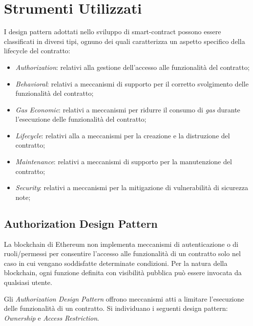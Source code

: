 \chapter{Strumenti Utilizzati}
I design pattern adottati nello sviluppo di smart-contract possono essere classificati in diversi tipi\cite[alcuni tipi]{9089272}\cite{9050163}, ognuno dei quali caratterizza un aspetto specifico della lifecycle del contratto:

\begin{itemize}
	\item \textit{Authorization}: relativi alla gestione dell'accesso alle funzionalità del contratto;
	\item \textit{Behavioral}: relativi a meccanismi di supporto per il corretto svolgimento delle funzionalità del contratto;
	\item \textit{Gas Economic}: relativi a meccanismi per ridurre il consumo di \textit{gas} durante l'esecuzione delle funzionalità del contratto;
	\item \textit{Lifecycle}: relativi alla a meccanismi per la creazione e la distruzione del contratto;
	\item \textit{Maintenance}: relativi a meccanismi di supporto per la manutenzione del contratto;
	\item \textit{Security}: relativi a meccanismi per la mitigazione di vulnerabilità di sicurezza note;
\end{itemize}

\section{Authorization Design Pattern}
La blockchain di Ethereum non implementa meccanismi di autenticazione o di ruoli/permessi per consentire l'accesso alle funzionalità di un contratto solo nel caso in cui vengano soddisfatte determinate condizioni. Per la natura della blockchain, ogni funzione definita con visibilità pubblica può essere invocata da qualsiasi utente.\par
Gli \textit{Authorization Design Pattern} offrono meccanismi atti a limitare l'esecuzione delle funzionalità di un contratto. Si individuano i seguenti design pattern: \textit{Ownership} e \textit{Access Restriction}.
